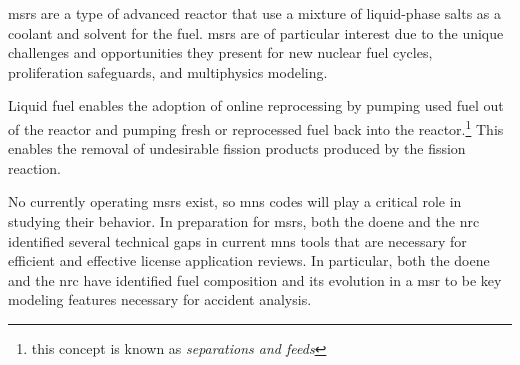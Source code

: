 \documentclass[letterpaper]{mc2023}
\begin{document}
 
\Gls{msr}s are a type of advanced reactor that use a mixture of liquid-phase salts
as a coolant and solvent for the fuel. \Gls{msr}s are of particular interest due
to the unique challenges and opportunities they present for new nuclear fuel
cycles, proliferation safeguards, and multiphysics modeling.

Liquid fuel enables the adoption of online reprocessing by
pumping used fuel out of the reactor and pumping fresh or reprocessed fuel back
into the reactor.\footnote{this concept is known as {\it separations and feeds}}
This enables the removal of undesirable fission products produced by the fission
reaction.




No currently operating \Gls{msr}s exist, so \gls{mns} codes will play a
critical role in studying their behavior. In preparation for \Gls{msr}s,
both the \Gls{doene} and the \Gls{nrc} identified several technical gaps
in current \Gls{mns} tools that are necessary for efficient and effective
license application reviews. In particular, both the
\Gls{doene}\cite{betzler_modeling_2019} and the
\Gls{nrc}\cite{usnrc_nonlwr_2020-1} have identified fuel composition and its
evolution in a \Gls{msr} to be key modeling features necessary for accident
analysis. 
\end{document}
